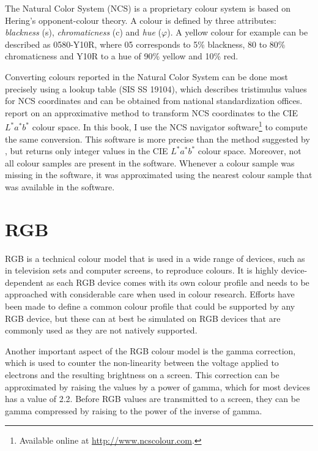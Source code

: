 The Natural Color System (NCS) is a proprietary colour system is based on 
Hering's opponent-colour theory. A colour is defined by three attributes:
\emph{blackness} (s), \emph{chromaticness} (c) and \emph{hue}
($\varphi$). A yellow colour for example can be described as 0580-Y10R,
where 05 corresponds to 5\% blackness, 80 to 80\% chromaticness and
Y10R to a hue of 90\% yellow and 10\% red.

Converting colours reported in the Natural Color System can be done
most precisely using a lookup table (SIS SS 19104), which describes
tristimulus values for NCS coordinates and can be obtained from national
standardization offices. \cite{derefeldt86transformation} report on an
approximative method to transform NCS coordinates to the CIE
$L^*a^*b^*$ colour space. In this book, I use the NCS navigator 
software\footnote{Available online at \url{http://www.ncscolour.com}.}
to compute the same conversion. This software is more precise 
than the method suggested by \cite{derefeldt86transformation}, but returns 
only integer values in the CIE $L^*a^*b^*$ colour space. Moreover, not all
colour samples are present in the software. Whenever a colour sample
was missing in the software, it was approximated using the nearest
colour sample that was available in the software.

\section{RGB}
\label{s:RGB}

RGB is a technical colour model that is used in a wide range of
devices, such as in television sets and computer screens, to reproduce
colours. It is highly device-dependent as each RGB device comes with
its own colour profile and needs to be approached with considerable
care when used in colour research. Efforts have been made to define a
common colour profile that could be supported by any RGB device, but
these can at best be simulated on RGB devices that are commonly used
as they are not natively supported.

Another important aspect of the RGB colour model is the gamma
correction, which is used to counter the non-linearity between the
voltage applied to electrons and the resulting brightness on a
screen. This correction can be approximated by raising the values by a
power of gamma, which for most devices has a value of 2.2. Before RGB
values are transmitted to a screen, they can be gamma compressed by
raising to the power of the inverse of gamma.

